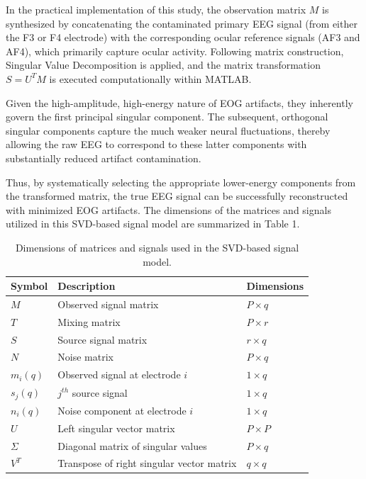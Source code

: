 \documentclass[17pt,a4paper]{extarticle}
\begin{document}
In the practical implementation of this study, the observation matrix $M$ is
synthesized by concatenating the contaminated primary EEG signal (from either the
F3 or F4 electrode) with the corresponding ocular reference signals (AF3 and AF4),
which primarily capture ocular activity. Following matrix construction, Singular Value
Decomposition is applied, and the matrix transformation $S = U^TM$ is executed
computationally within MATLAB.

Given the high-amplitude, high-energy nature of EOG artifacts, they inherently
govern the first principal singular component. The subsequent, orthogonal singular
components capture the much weaker neural fluctuations, thereby allowing the raw
EEG to correspond to these latter components with substantially reduced artifact
contamination.

Thus, by systematically selecting the appropriate lower-energy components from
the transformed matrix, the true EEG signal can be successfully reconstructed with
minimized EOG artifacts. The dimensions of the matrices and signals utilized in this
SVD-based signal model are summarized in Table 1.

\begin{table}[H]
\centering
\small
\begin{tabular}{>{\raggedright\arraybackslash}p{} >{\raggedright\arraybackslash}p{} >{\raggedright\arraybackslash}p{}}
\toprule
Symbol & Description & Dimensions \\
\midrule
$M$ & Observed signal matrix & $P \times q$ \\
$T$ & Mixing matrix & $P \times r$ \\
$S$ & Source signal matrix & $r \times q$ \\
$N$ & Noise matrix & $P \times q$ \\
$m_i(q)$ & Observed signal at electrode $i$ & $1 \times q$ \\
$s_j(q)$ & $j^{th}$ source signal & $1 \times q$ \\
$n_i(q)$ & Noise component at electrode $i$ & $1 \times q$ \\
$U$ & Left singular vector matrix & $P \times P$ \\
$\Sigma$ & Diagonal matrix of singular values & $P \times q$ \\
$V^T$ & Transpose of right singular vector matrix & $q \times q$ \\
\bottomrule
\end{tabular}
\caption{Dimensions of matrices and signals used in the SVD-based signal model.}
\end{table}
\end{document}
